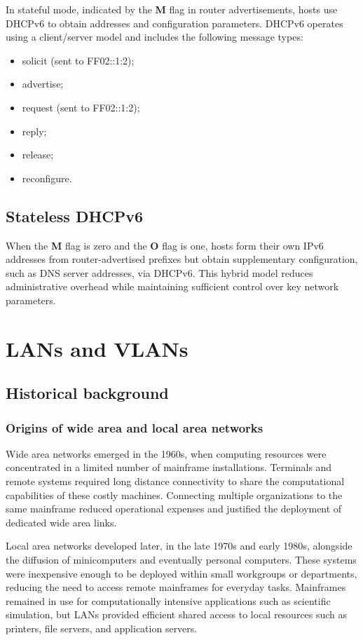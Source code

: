 \documentclass[11pt,a4paper,openany]{report}
\begin{document}
In stateful mode, indicated by the \textbf{M} flag in router advertisements, hosts use DHCPv6 to obtain addresses and configuration parameters. DHCPv6 operates using a client/server model and includes the following message types:

\begin{itemize}
\item solicit (sent to FF02::1:2);
\item advertise;
\item request (sent to FF02::1:2);
\item reply;
\item release;
\item reconfigure.
\end{itemize}

\section{Stateless DHCPv6}

When the \textbf{M} flag is zero and the \textbf{O} flag is one, hosts form their own IPv6 addresses from router-advertised prefixes but obtain supplementary configuration, such as DNS server addresses, via DHCPv6. This hybrid model reduces administrative overhead while maintaining sufficient control over key network parameters.

\chapter{LANs and VLANs}

\section{Historical background}

\subsection{Origins of wide area and local area networks}

Wide area networks emerged in the 1960s, when computing resources were concentrated in a limited number of mainframe installations. Terminals and remote systems required long distance connectivity to share the computational capabilities of these costly machines. Connecting multiple organizations to the same mainframe reduced operational expenses and justified the deployment of dedicated wide area links.

Local area networks developed later, in the late 1970s and early 1980s, alongside the diffusion of minicomputers and eventually personal computers. These systems were inexpensive enough to be deployed within small workgroups or departments, reducing the need to access remote mainframes for everyday tasks. Mainframes remained in use for computationally intensive applications such as scientific simulation, but LANs provided efficient shared access to local resources such as printers, file servers, and application servers.
\end{document}
